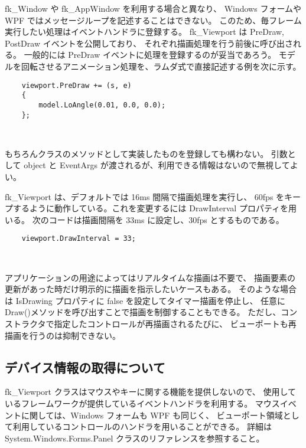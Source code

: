 fk\_Window や fk\_AppWindow を利用する場合と異なり、
Windows フォームや WPF ではメッセージループを記述することはできない。
このため、毎フレーム実行したい処理はイベントハンドラに登録する。
fk\_Viewport は PreDraw, PostDraw イベントを公開しており、
それぞれ描画処理を行う前後に呼び出される。
一般的には PreDraw イベントに処理を登録するのが妥当であろう。
モデルを回転させるアニメーション処理を、ラムダ式で直接記述する例を次に示す。
\\
\begin{screen}
\begin{verbatim}
    viewport.PreDraw += (s, e)
    {
        model.LoAngle(0.01, 0.0, 0.0);
    };
\end{verbatim}
\end{screen}
~

もちろんクラスのメソッドとして実装したものを登録しても構わない。
引数として object と EventArgs が渡されるが、利用できる情報はないので無視してよい。

fk\_Viewport は、デフォルトでは 16ms 間隔で描画処理を実行し、
60fps をキープするように動作している。これを変更するには DrawInterval プロパティを用いる。
次のコードは描画間隔を 33ms に設定し、30fps とするものである。
\\
\begin{screen}
\begin{verbatim}
    viewport.DrawInterval = 33;
\end{verbatim}
\end{screen}
~

アプリケーションの用途によってはリアルタイムな描画は不要で、
描画要素の更新があった時だけ明示的に描画を指示したいケースもある。
そのような場合は IsDrawing プロパティに false を設定してタイマー描画を停止し、
任意に Draw()メソッドを呼び出すことで描画を制御することもできる。
ただし、コンストラクタで指定したコントロールが再描画されるたびに、
ビューポートも再描画を行うのは抑制できない。

\subsection{デバイス情報の取得について}

fk\_Viewport クラスはマウスやキーに関する機能を提供しないので、
使用しているフレームワークが提供しているイベントハンドラを利用する。
マウスイベントに関しては、Windows フォームも WPF も同じく、
ビューポート領域として利用しているコントロールのハンドラを用いることができる。
詳細は System.Windows.Forms.Panel クラスのリファレンスを参照すること。

